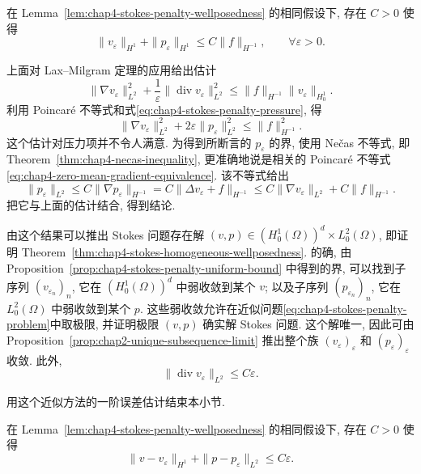 \begin{Proposition}
\label{prop:chap4-stokes-penalty-uniform-bound}
在 Lemma~\ref{lem:chap4-stokes-penalty-wellposedness} 的相同假设下, 存在 $C>0$ 使得
\[
 \|v_\varepsilon\|_{H^1}+\|p_\varepsilon\|_{H^1}
 \leq C\|f\|_{H^{-1}},
 \qquad\forall\varepsilon>0.
\]
\end{Proposition}

\begin{Proof}
上面对 Lax--Milgram 定理的应用给出估计
\[
 \|\nabla v_\varepsilon\|_{L^2}^2
 +\frac1\varepsilon\|\operatorname{div}v_\varepsilon\|_{L^2}^2
 \leq\|f\|_{H^{-1}}\|v_\varepsilon\|_{H_0^1}.
\]
利用 Poincaré 不等式和式\eqref{eq:chap4-stokes-penalty-pressure}, 得
\[
 \|\nabla v_\varepsilon\|_{L^2}^2
 +2\varepsilon\|p_\varepsilon\|_{L^2}^2
 \leq\|f\|_{H^{-1}}^2.
\]
这个估计对压力项并不令人满意. 为得到所断言的 $p_\varepsilon$ 的界, 使用 Nečas 不等式, 即 Theorem~\ref{thm:chap4-necas-inequality}, 更准确地说是相关的 Poincaré 不等式\eqref{eq:chap4-zero-mean-gradient-equivalence}. 该不等式给出
\[
 \|p_\varepsilon\|_{L^2}
 \leq C\|\nabla p_\varepsilon\|_{H^{-1}}
 =C\|\Delta v_\varepsilon+f\|_{H^{-1}}
 \leq C\|\nabla v_\varepsilon\|_{L^2}+C\|f\|_{H^{-1}}.
\]
把它与上面的估计结合, 得到结论.
\end{Proof}

由这个结果可以推出 Stokes 问题存在解 $(v,p)\in(H_0^1(\Omega))^d\times L_0^2(\Omega)$, 即证明 Theorem~\ref{thm:chap4-stokes-homogeneous-wellposedness}. 的确, 由 Proposition~\ref{prop:chap4-stokes-penalty-uniform-bound} 中得到的界, 可以找到子序列 $(v_{\varepsilon_n})_n$, 它在 $(H_0^1(\Omega))^d$ 中弱收敛到某个 $v$; 以及子序列 $(p_{\varepsilon_n})_n$, 它在 $L_0^2(\Omega)$ 中弱收敛到某个 $p$. 这些弱收敛允许在近似问题\eqref{eq:chap4-stokes-penalty-problem}中取极限, 并证明极限 $(v,p)$ 确实解 Stokes 问题. 这个解唯一, 因此可由 Proposition~\ref{prop:chap2-unique-subsequence-limit} 推出整个族 $(v_\varepsilon)_\varepsilon$ 和 $(p_\varepsilon)_\varepsilon$ 收敛. 此外,
\[
 \|\operatorname{div}v_\varepsilon\|_{L^2}\leq C\varepsilon.
\]

用这个近似方法的一阶误差估计结束本小节.

\begin{Proposition}
\label{prop:chap4-stokes-penalty-error}
在 Lemma~\ref{lem:chap4-stokes-penalty-wellposedness} 的相同假设下, 存在 $C>0$ 使得
\[
 \|v-v_\varepsilon\|_{H^1}+\|p-p_\varepsilon\|_{L^2}\leq C\varepsilon.
\]
\end{Proposition}

